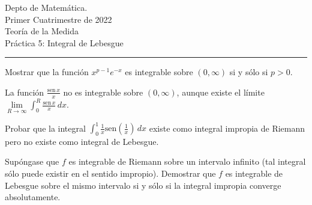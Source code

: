 \documentclass{book}
\begin{document}


\begin{large}
\begin{bfseries} %
        \noindent Depto de Matem\'atica.\\
        Primer Cuatrimestre de 2022\\                                                                                                                                                                                                                                                                                                                                                
        Teoría de la Medida \\
        Práctica 5: Integral de Lebesgue

\end{bfseries}
\end{large}
\par\noindent\rule{\textwidth}{.5pt}








\begin{ejer}{}
  Mostrar que la función $x^{p-1} e^{-x}$ es integrable sobre $(0,\infty)$ si y sólo si $p>0$.
	\end{ejer}
  
	\begin{ejer}{}
  La función $\frac{\text{sen}\,x}{x}$ no es integrable sobre $(0,\infty)$, aunque existe el límite
\linebreak  $\lim\limits_{R\rightarrow \infty}\int_0^R \frac{\text{sen}\,x}{x}\,dx.$
\end{ejer}
	
	\begin{ejer}{}
	Probar que la integral $\int_0^1 \frac{1}{x}\text{sen} \left(\frac{1}{x}\right)\,dx$ 
	existe como integral impropia de Riemann pero no existe como integral de Lebesgue.
	\end{ejer}

	\begin{ejer}{}
	Sup\'ongase que $f$ es integrable de Riemann sobre un intervalo  infinito (tal integral
	s\'olo puede existir en el sentido impropio). 
	Demostrar que $f$ es integrable de Lebesgue sobre el mismo intervalo si y s\'olo si la integral
	impropia converge absolutamente.
  \end{ejer}
	
\end{document}
